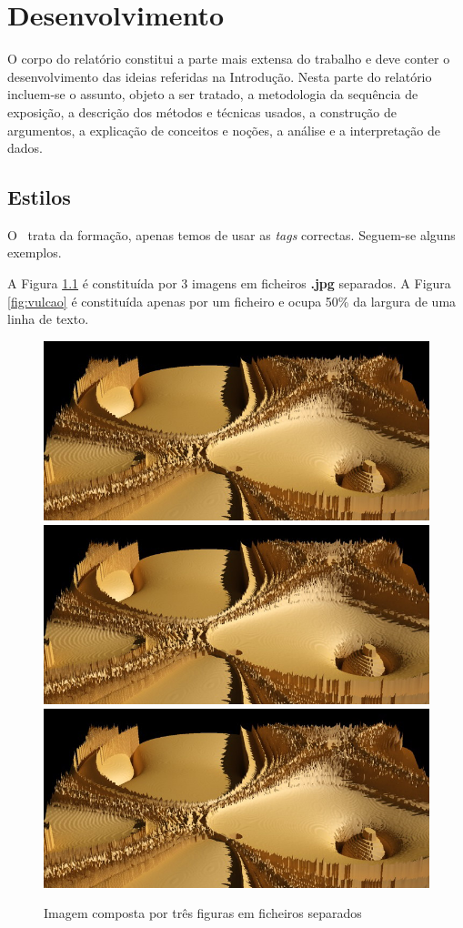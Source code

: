 

\chapter{Desenvolvimento}
\label{ch:desenvolvimento}

O corpo do relatório constitui a parte mais extensa do trabalho e deve conter o desenvolvimento das ideias referidas na Introdução. Nesta parte do relatório incluem-se o assunto, objeto a ser tratado, a metodologia da sequência de exposição, a descrição dos métodos e técnicas usados, a construção de argumentos, a explicação de conceitos e noções, a análise e a interpretação de dados.
 
\section{Estilos}

O \LaTeXe\ trata da formação, apenas temos de usar as \emph{tags} correctas. Seguem-se alguns exemplos. 

A Figura \ref{fig:terrenos} é constituída por 3 imagens em ficheiros \textbf{.jpg} separados. A Figura \ref{fig:vulcao} é constituída apenas por um ficheiro e ocupa 50\% da largura de uma linha de texto.


\begin{figure}
 \centering
 \includegraphics[width=0.32\linewidth]{imgs/tp04a_450}
 \includegraphics[width=0.32\linewidth]{imgs/tp04a_450}
 \includegraphics[width=0.32\linewidth]{imgs/tp04a_450}
 \caption[Imagem composta]{Imagem composta por três figuras em ficheiros separados}
 \label{fig:terrenos}
\end{figure}


